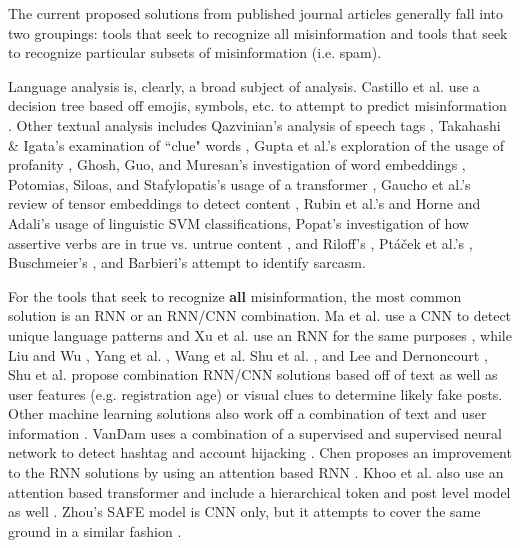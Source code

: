 \documentclass[preprint,12pt]{elsarticle}
\begin{document}
The current proposed solutions from published journal articles generally fall into two groupings: tools that seek to recognize all misinformation and tools that seek to recognize particular subsets of misinformation (i.e. spam).

Language analysis is, clearly, a broad subject of analysis.  Castillo et al. use a decision tree based off emojis, symbols, etc. to attempt to predict misinformation \cite{castillo2011information}. Other textual analysis includes Qazvinian's analysis of speech tags \cite{qazvinian2011rumor}, Takahashi \& Igata's examination of ``clue" words \cite{takahashi2012rumor}, Gupta et al.'s exploration of the usage of profanity \cite{gupta2014tweetcred}, Ghosh, Guo, and Muresan's investigation of word embeddings \cite{ghosh2015sarcastic}, Potomias, Siloas, and Stafylopatis's usage of a transformer \cite{potamias2020transformer}, Gaucho et al.'s review of tensor embeddings to detect content \cite{guacho2018semi}, Rubin et al.'s \cite{rubin2016fake} and Horne and Adali's \cite{horne2017just} usage of linguistic SVM classifications, Popat's investigation of how assertive verbs are in true vs. untrue content \cite{popat2017assessing}, and Riloff's \cite{riloff2013sarcasm}, Pt{\'a}{\v{c}}ek et al.'s \cite{ptavcek2014sarcasm}, Buschmeier's \cite{buschmeier2014impact}, and Barbieri's \cite{barbieri2014modelling} attempt to identify sarcasm.

For the tools that seek to recognize \textbf{all} misinformation, the most common solution is an RNN or an RNN/CNN combination. Ma et al. use a CNN to detect unique language patterns \cite{ma2018rumor} and Xu et al. use an RNN for the same purposes \cite{xu2019deep}, while Liu and Wu \cite{liu2018early}, Yang et al. \cite{yang2012automatic}, Wang et al. \cite{wang2018eann} Shu et al. \cite{shu2019role}, and Lee and Dernoncourt \cite{lee2016sequential}, Shu et al. \cite{shu2019beyond,shu2020leveraging} propose combination RNN/CNN solutions based off of text as well as user features (e.g. registration age) or visual clues to determine likely fake posts.  Other machine learning solutions also work off a combination of text and user information \cite{sun2013detecting,kwon2017rumor,ma2015detect,ma2016detecting,zhao2015enquiring}. VanDam uses a combination of a supervised and supervised neural network to detect hashtag and account hijacking \cite{vandam2019learning}. Chen proposes an improvement to the RNN solutions by using an attention based RNN \cite{chen2018call}. Khoo et al. also use an attention based transformer and include a hierarchical token and post level model as well \cite{khoo2020interpretable}. Zhou's SAFE model is CNN only, but it attempts to cover the same ground in a similar fashion \cite{zhou2020mathsf}.
\end{document}
